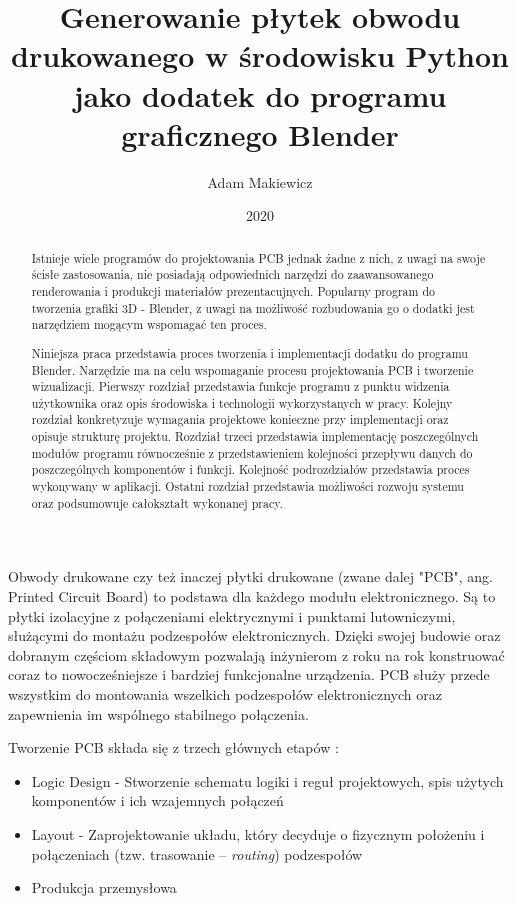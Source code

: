 \documentclass{xmgr}
\author   {Adam Makiewicz}
\title    {Generowanie płytek obwodu drukowanego w środowisku Python jako dodatek do programu graficznego Blender}
\date     {2020}
\begin{document}
\begin{abstract}
Istnieje wiele programów do projektowania PCB jednak żadne z nich, z uwagi na swoje ścisłe zastosowania, nie posiadają odpowiednich narzędzi do zaawansowanego renderowania i produkcji materiałów prezentacujnych. Popularny program do tworzenia grafiki 3D - Blender, z uwagi na możliwość rozbudowania go o dodatki jest narzędziem mogącym wspomagać ten proces.

Niniejsza praca przedstawia proces tworzenia i implementacji dodatku do programu Blender. Narzędzie ma na celu wspomaganie procesu projektowania PCB i tworzenie wizualizacji. Pierwszy rozdział przedstawia funkcje programu z punktu widzenia użytkownika oraz opis środowiska i technologii wykorzystanych w pracy.
Kolejny rozdział konkretyzuje wymagania projektowe konieczne przy implementacji oraz opisuje strukturę projektu.
Rozdział trzeci przedstawia implementację poszczególnych modułów programu równocześnie z przedstawieniem kolejności przepływu danych do poszczególnych komponentów i funkcji. Kolejność podrozdziałów przedstawia proces wykonywany w aplikacji. Ostatni rozdział przedstawia możliwości rozwoju systemu oraz podsumowuje całokształt wykonanej pracy. 

\end{abstract}



\maketitle

\introduction

Obwody drukowane czy też inaczej płytki drukowane (zwane dalej "PCB", ang. Printed Circuit Board) to podstawa dla każdego modułu elektronicznego. Są to płytki izolacyjne z połączeniami elektrycznymi i punktami lutowniczymi, służącymi do montażu podzespołów elektronicznych. Dzięki swojej budowie oraz dobranym częściom składowym pozwalają inżynierom z roku na rok konstruować coraz to nowocześniejsze i bardziej funkcjonalne urządzenia. PCB służy przede wszystkim do montowania wszelkich podzespołów elektronicznych oraz zapewnienia im wspólnego stabilnego połączenia.

\vspace{5mm}
Tworzenie PCB składa się z trzech głównych etapów \cite{Abboud}:

\begin{itemize}
\item
Logic Design - Stworzenie schematu logiki i reguł projektowych, spis użytych komponentów i ich wzajemnych połączeń
\item
Layout - Zaprojektowanie układu, który decyduje o fizycznym położeniu i połączeniach (tzw. trasowanie -- \emph{routing}) podzespołów
\item
Produkcja przemysłowa
\end{itemize}
    
\end{document}
